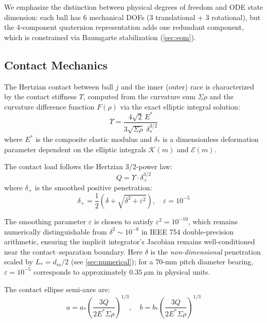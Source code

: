 \documentclass[preprint,12pt]{elsarticle}
\begin{document}
We emphasize the distinction between physical degrees of freedom and ODE state dimension: each ball has 6 mechanical DOFs (3 translational + 3 rotational), but the 4-component quaternion representation adds one redundant component, which is constrained via Baumgarte stabilization (\cref{sec:eom}).


\subsection{Contact Mechanics}
\label{sec:contact}

The Hertzian contact between ball $j$ and the inner (outer) race is characterized by the contact stiffness $\Upsilon$, computed from the curvature sum $\Sigma\rho$ and the curvature difference function $F(\rho)$ via the exact elliptic integral solution:
\begin{equation}
    \Upsilon = \frac{4\sqrt{2}\,E^*}{3\sqrt{\Sigma\rho}\;\delta_*^{3/2}}
    \label{eq:stiffness}
\end{equation}
where $E^*$ is the composite elastic modulus and $\delta_*$ is a dimensionless deformation parameter dependent on the elliptic integrals $\mathcal{K}(m)$ and $\mathcal{E}(m)$.

The contact load follows the Hertzian $3/2$-power law:
\begin{equation}
    Q = \Upsilon \cdot \delta_+^{3/2}
    \label{eq:hertz_q}
\end{equation}
where $\delta_+$ is the smoothed positive penetration:
\begin{equation}
    \delta_+ = \frac{1}{2}\left(\delta + \sqrt{\delta^2 + \varepsilon^2}\right), \quad \varepsilon = 10^{-5}
    \label{eq:smooth_delta}
\end{equation}

The smoothing parameter $\varepsilon$ is chosen to satisfy $\varepsilon^2 = 10^{-10}$, which remains numerically distinguishable from $\delta^2 \sim 10^{-8}$ in IEEE 754 double-precision arithmetic, ensuring the implicit integrator's Jacobian remains well-conditioned near the contact--separation boundary. Here $\delta$ is the \emph{non-dimensional} penetration scaled by $L_* = d_m/2$ (see \cref{sec:numerical}); for a 70-mm pitch diameter bearing, $\varepsilon = 10^{-5}$ corresponds to approximately $0.35~\mu$m in physical units.

The contact ellipse semi-axes are:
\begin{equation}
    a = a_* \left(\frac{3Q}{2E^*\Sigma\rho}\right)^{1/3}, \quad
    b = b_* \left(\frac{3Q}{2E^*\Sigma\rho}\right)^{1/3}
\end{equation}
\end{document}
